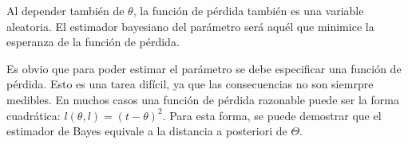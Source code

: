 Al depender tambi\'en de $\theta$, la funci\'on de p\'erdida tambi\'en es una variable aleatoria. El estimador bayesiano del par\'ametro ser\'a aqu\'el que minimice la esperanza de la funci\'on de p\'erdida.

Es obvio que para poder estimar el par\'ametro se debe especificar una funci\'on de p\'erdida. Esto es una tarea dif\'icil, ya que las consecuencias no son siemrpre medibles. En muchos casos una funci\'on de p\'erdida razonable puede ser la forma cuadr\'atica: $l(\theta, l)=(t-\theta)^2$. Para esta forma, se puede demostrar que el estimador de Bayes equivale a la distancia a posteriori de $\Theta$.